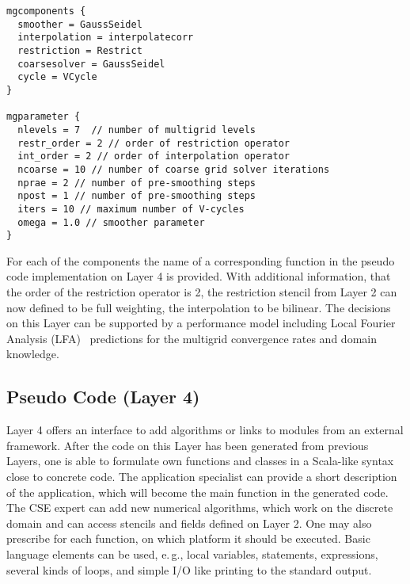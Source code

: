 \documentclass[onecolumn]{svjour3}
\begin{document}
\begin{verbatim} 
mgcomponents { 
  smoother = GaussSeidel 
  interpolation = interpolatecorr  
  restriction = Restrict 
  coarsesolver = GaussSeidel 
  cycle = VCycle 
} 

mgparameter { 
  nlevels = 7  // number of multigrid levels 
  restr_order = 2 // order of restriction operator
  int_order = 2 // order of interpolation operator
  ncoarse = 10 // number of coarse grid solver iterations
  nprae = 2 // number of pre-smoothing steps 
  npost = 1 // number of pre-smoothing steps 
  iters = 10 // maximum number of V-cycles
  omega = 1.0 // smoother parameter
} 
\end{verbatim}


For each of the components the name of a corresponding function in the pseudo code implementation on Layer 4 is provided. With additional information, that the order of the restriction operator is 2, the restriction stencil from Layer 2 can now defined to be full weighting, the interpolation to be bilinear. The decisions on this Layer can be supported by a performance model including Local Fourier Analysis (LFA)~\cite{Wienands05} predictions for the multigrid convergence rates and domain knowledge. 

\subsection{Pseudo Code (Layer 4)}

Layer 4 offers an interface to add algorithms or links to modules from an external framework. After the code on this Layer has been generated from previous Layers, one is able to formulate own functions and classes in a Scala-like syntax close to concrete code. 
The application specialist can provide a short description of the application, which will become the main function in the generated code. The CSE expert can add new numerical algorithms, which work on the discrete domain and can access stencils and fields defined on Layer 2. One may also prescribe for each function, on which platform it should be executed. Basic language elements can be used, e.\,g., local variables, statements, expressions, several kinds of loops, and simple I/O like printing to the standard output. 
\end{document}
